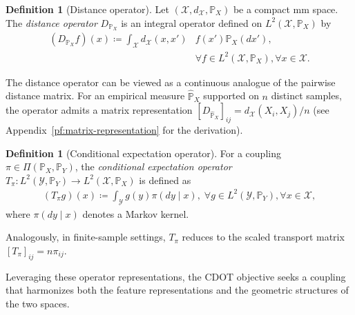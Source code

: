 \documentclass{article}
\theoremstyle{plain}
\theoremstyle{definition}
\newtheorem{definition}[theorem]{Definition}
\theoremstyle{remark}
\begin{document}
\begin{definition}[Distance operator]
	\label{def:distance-operator}
	Let $(\mathcal{X},d_{\mathcal{X}},\mathbb{P}_X)$ be a compact mm space. The \emph{distance operator} $D_{\mathbb{P}_X}$ is an integral operator defined on $L^2(\mathcal{X},\mathbb{P}_X)$ by
	\begin{align*}
		(D_{\mathbb{P}_X}f)(x) \coloneqq \int_{\mathcal{X}} d_{\mathcal{X}}(x,x') &f(x') \mathbb{P}_X(dx') , \\ &\forall f \in L^2(\mathcal{X},\mathbb{P}_X), \forall x \in \mathcal{X} .
	\end{align*}
\end{definition}

The distance operator can be viewed as a continuous analogue of the pairwise distance matrix. For an empirical measure $\hat{\mathbb{P}}_X$ supported on $n$ distinct samples, the operator admits a matrix representation $[D_{\hat{\mathbb{P}}_X}]_{ij} = d_{\mathcal{X}}(X_i, X_j)/n$ (see Appendix~\ref{pf:matrix-representation} for the derivation).

\begin{definition}[Conditional expectation operator]
	\label{def:conditional-expectation-operator}
	For a coupling $\pi \in \Pi(\mathbb{P}_X,\mathbb{P}_Y)$, the \emph{conditional expectation operator} $T_{\pi}: L^2(\mathcal{Y},\mathbb{P}_Y) \to L^2(\mathcal{X},\mathbb{P}_X)$ is defined as
	\begin{align*}
		(T_{\pi}g)(x) \coloneqq \int_{\mathcal{Y}} g(y) \pi(dy \mid x) , \; \forall g \in L^2(\mathcal{Y},\mathbb{P}_Y), \forall x \in \mathcal{X},
	\end{align*}
	where $\pi(dy \mid x)$ denotes a Markov kernel. %
\end{definition}

Analogously, in finite-sample settings, $T_\pi$ reduces to the scaled transport matrix $[T_\pi]_{ij} = n \pi_{ij}$.

Leveraging these operator representations, the CDOT objective seeks a coupling that harmonizes both the feature representations and the geometric structures of the two spaces.
\end{document}
